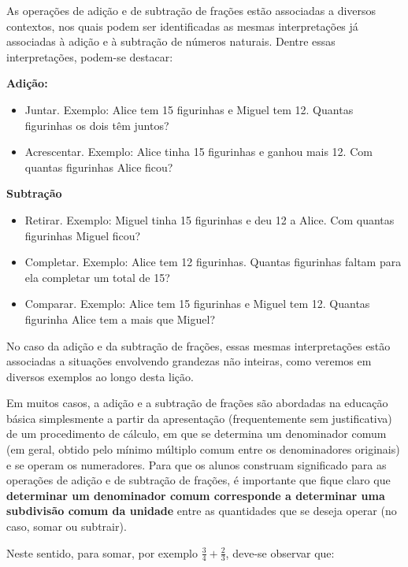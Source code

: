 \begin{multicols}{2}
\noindent {\color{special}{\Large \bf LIÇÃO 5 - Para o professor}}
\vspace{.5cm}

  As operações de adição e de subtração de frações estão associadas a diversos contextos, nos quais podem ser identificadas as mesmas interpretações já associadas à adição e à subtração de números naturais.
  Dentre essas interpretações, podem-se destacar:

{\bf Adição:}
\begin{itemize} %
    \item       Juntar. Exemplo: Alice tem 15 figurinhas e Miguel tem 12. Quantas figurinhas os dois têm juntos?
    \item       Acrescentar. Exemplo: Alice tinha 15 figurinhas e ganhou mais 12. Com quantas figurinhas Alice ficou?
\end{itemize} %


{\bf Subtração}
\begin{itemize} %
    \item       Retirar. Exemplo: Miguel tinha 15 figurinhas e deu 12 a Alice. Com quantas figurinhas Miguel ficou?
    \item       Completar. Exemplo: Alice tem 12 figurinhas. Quantas figurinhas faltam para ela completar um total de 15?
    \item       Comparar. Exemplo: Alice tem 15 figurinhas e Miguel tem 12. Quantas figurinha Alice tem a mais que Miguel?
\end{itemize} %


  No caso da adição e da subtração de frações, essas mesmas interpretações estão associadas a situações envolvendo grandezas não inteiras, como veremos em diversos exemplos ao longo desta lição.

  Em muitos casos, a adição e a subtração de frações são abordadas na educação básica simplesmente a partir da apresentação (frequentemente sem justificativa) de um procedimento de cálculo, em que se determina um denominador comum (em geral, obtido pelo mínimo múltiplo comum entre os denominadores originais) e se operam os numeradores. Para que os alunos construam significado para as operações de adição e de subtração de frações, é importante que fique claro que   {\bf determinar um denominador comum corresponde a determinar uma subdivisão comum da unidade}   entre as quantidades que se deseja operar (no caso, somar ou subtrair).

  Neste sentido, para somar, por exemplo   $\frac{3}{4} + \frac{2}{3}$, deve-se observar que:


\end{multicols}
